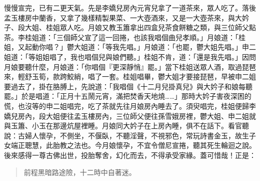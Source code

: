 慢慢宣完，已有二更天氣。先是李嬌兒房內元宵兒拿了一道茶來，眾人吃了。落後孟玉樓房中蘭香，又拿了幾樣精製果菜、一大壺酒來，又是一大壺茶來，與大妗子、段大姐、桂姐眾人吃。月娘又教玉簫拿出四盒兒茶食餅糖之類，與三位師父點茶。李桂姐道：「三個師父宣了這一回捲，也該我唱個曲兒孝順。」月娘道：「桂姐，又起動你唱？」鬱大姐道：「等我先唱。」月娘道：「也罷，鬱大姐先唱。」申二姐道：「等姐姐唱了，我也唱個兒與娘們聽。」桂姐不肯，道：「還是我先唱。」因問月娘要聽什麼，月娘道：「你唱個『更深靜悄』罷。」當下桂姐送眾人酒，取過琵琶來，輕舒玉筍，款跨鮫綃，唱了一套。桂姐唱畢，鬱大姐才要接琵琶，早被申二姐要過去了，掛在胳膊上，先說道：「我唱個《十二月兒掛真兒》與大妗子和娘每聽罷。」於是唱道：「正月十五鬧元宵，滿把焚香天地燒……」那時大妗子害夜深困的慌，也沒等的申二姐唱完，吃了茶就先往月娘房內睡去了。須臾唱完，桂姐便歸李嬌兒房內，段大姐便往孟玉樓房內，三位師父便往孫雪娥房裡，鬱大姐、申二姐就與玉簫、小玉在那邊炕屋裡睡。月娘同大妗子在上房內睡，俱不在話下。看官聽說：古婦人懷孕，不側坐，不偃臥，不聽淫聲，不視邪色，常玩詩書金玉，故生子女端正聰慧，此胎教之法也。今月娘懷孕，不宜令僧尼宣捲，聽其死生輪迴之說。後來感得一尊古佛出世，投胎奪舍，幻化而去，不得承受家緣。蓋可惜哉！正是：
\begin{quote}
前程黑暗路途險，十二時中自著迷。
\end{quote}
